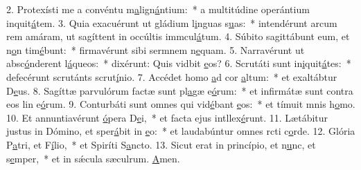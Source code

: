 2. Protexísti me a convéntu m\uline{a}lign\uline{á}ntium:~* a multitúdine operántium inquit\uline{á}tem.
3. Quia exacuérunt ut gládium l\uline{i}nguas s\uline{u}as:~* intendérunt arcum rem amáram, ut sagíttent in occúltis immcul\uline{á}tum.
4. Súbito sagittábunt eum, et n\uline{o}n tim\uline{é}bunt:~* firmavérunt sibi sermnem n\uline{e}quam.
5. Narravérunt ut absc\uline{ó}nderent l\uline{á}queos:~* dixérunt: Quis vidbit \uline{e}os?
6. Scrutáti sunt in\uline{i}quit\uline{á}tes:~* defecérunt scrutánts scrut\uline{í}nio.
7. Accédet homo \uline{a}d cor \uline{a}ltum:~* et exaltábtur D\uline{e}us.
8. Sagíttæ parvulórum factæ sunt pl\uline{a}gæ e\uline{ó}rum:~* et infirmátæ sunt contra eos lin e\uline{ó}rum.
9. Conturbáti sunt omnes qui vid\uline{é}bant \uline{e}os:~* et tímuit mnis h\uline{o}mo.
10. Et annuntiavérunt \uline{ó}pera D\uline{e}i,~* et facta ejus intllex\uline{é}runt.
11. Lætábitur justus in Dómino, et sper\uline{á}bit in \uline{e}o:~* et laudabúntur omnes rcti c\uline{o}rde.
12. Glória P\uline{a}tri, et F\uline{í}lio,~* et Spiríti S\uline{a}ncto.
13. Sicut erat in princípio, et n\uline{u}nc, et s\uline{e}mper,~* et in sǽcula sæculrum. \uline{A}men.
